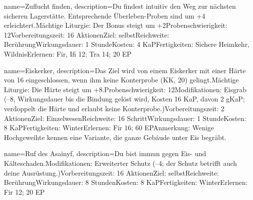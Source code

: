{
    name={Zuflucht finden},
    description={Du findest intuitiv den Weg zur nächsten sicheren Lagerstätte. Entsprechende Überleben-Proben sind um +4 erleichtert.\newline Mächtige Liturgie: Der Bonus steigt um +2\newline Probenschwierigkeit: 12\newline Vorbereitungszeit: 16 Aktionen\newline Ziel: selbst\newline Reichweite: Berührung\newline Wirkungsdauer: 1 Stunde\newline Kosten: 4 KaP\newline Fertigkeiten: Sichere Heimkehr, Wildnis\newline Erlernen: Fir, Ifi 12; Tra 14; 20 EP}
}


{
    name={Eiskerker},
    description={Das Ziel wird von einem Eiskerker mit einer Härte von 16 eingeschlossen, wenn ihm keine Konterprobe (KK, 20) gelingt.\newline Mächtige Liturgie: Die Härte steigt um +8.\newline Probenschwierigkeit: 12\newline Modifikationen: Eisgrab (–8, Wirkungsdauer bis die Bindung gelöst wird, Kosten 16 KaP, davon 2 gKaP; verdoppelt die Härte und erlaubt keine Konterprobe.)\newline Vorbereitungszeit: 2 Aktionen\newline Ziel: Einzelwesen\newline Reichweite: 16 Schritt\newline Wirkungsdauer: 1 Stunde\newline Kosten: 8 KaP\newline Fertigkeiten: Winter\newline Erlernen: Fir 16; 60 EP\newline Anmerkung: Wenige Hochgeweihte kennen eine Variante, die ganze Gebäude unter Eis begräbt. }
}


{
    name={Ruf des Asainyf},
    description={Du bist immun gegen Eis- und Kälteschaden.\newline Modifikationen: Erweiterter Schutz (–4; der Schutz betrifft auch deine Ausrüstung.)\newline Vorbereitungszeit: 16 Aktionen\newline Ziel: selbst\newline Reichweite: Berührung\newline Wirkungsdauer: 8 Stunden\newline Kosten: 8 KaP\newline Fertigkeiten: Winter\newline Erlernen: Fir 12; 20 EP}
}


